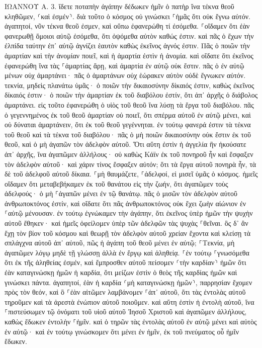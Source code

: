 \documentclass[twoside, 9pt]{extreport}
\begin{document}
ΙΩΑΝΝΟΥ Α.
3.
ἴδετε ποταπὴν ἀγάπην δέδωκεν ἡμῖν ὁ πατὴρ ἵνα τέκνα θεοῦ κληθῶμεν, ⸂καὶ ἐσμέν⸃. διὰ τοῦτο ὁ κόσμος οὐ γινώσκει ⸀ἡμᾶς ὅτι οὐκ ἔγνω αὐτόν. 
ἀγαπητοί, νῦν τέκνα θεοῦ ἐσμεν, καὶ οὔπω ἐφανερώθη τί ἐσόμεθα. ⸀οἴδαμεν ὅτι ἐὰν φανερωθῇ ὅμοιοι αὐτῷ ἐσόμεθα, ὅτι ὀψόμεθα αὐτὸν καθώς ἐστιν. 
καὶ πᾶς ὁ ἔχων τὴν ἐλπίδα ταύτην ἐπ᾽ αὐτῷ ἁγνίζει ἑαυτὸν καθὼς ἐκεῖνος ἁγνός ἐστιν. 
Πᾶς ὁ ποιῶν τὴν ἁμαρτίαν καὶ τὴν ἀνομίαν ποιεῖ, καὶ ἡ ἁμαρτία ἐστὶν ἡ ἀνομία. 
καὶ οἴδατε ὅτι ἐκεῖνος ἐφανερώθη ἵνα τὰς ⸀ἁμαρτίας ἄρῃ, καὶ ἁμαρτία ἐν αὐτῷ οὐκ ἔστιν. 
πᾶς ὁ ἐν αὐτῷ μένων οὐχ ἁμαρτάνει· πᾶς ὁ ἁμαρτάνων οὐχ ἑώρακεν αὐτὸν οὐδὲ ἔγνωκεν αὐτόν. 
τεκνία, μηδεὶς πλανάτω ὑμᾶς· ὁ ποιῶν τὴν δικαιοσύνην δίκαιός ἐστιν, καθὼς ἐκεῖνος δίκαιός ἐστιν· 
ὁ ποιῶν τὴν ἁμαρτίαν ἐκ τοῦ διαβόλου ἐστίν, ὅτι ἀπ᾽ ἀρχῆς ὁ διάβολος ἁμαρτάνει. εἰς τοῦτο ἐφανερώθη ὁ υἱὸς τοῦ θεοῦ ἵνα λύσῃ τὰ ἔργα τοῦ διαβόλου. 
πᾶς ὁ γεγεννημένος ἐκ τοῦ θεοῦ ἁμαρτίαν οὐ ποιεῖ, ὅτι σπέρμα αὐτοῦ ἐν αὐτῷ μένει, καὶ οὐ δύναται ἁμαρτάνειν, ὅτι ἐκ τοῦ θεοῦ γεγέννηται. 
ἐν τούτῳ φανερά ἐστιν τὰ τέκνα τοῦ θεοῦ καὶ τὰ τέκνα τοῦ διαβόλου· πᾶς ὁ μὴ ποιῶν δικαιοσύνην οὐκ ἔστιν ἐκ τοῦ θεοῦ, καὶ ὁ μὴ ἀγαπῶν τὸν ἀδελφὸν αὐτοῦ. 
Ὅτι αὕτη ἐστὶν ἡ ἀγγελία ἣν ἠκούσατε ἀπ᾽ ἀρχῆς, ἵνα ἀγαπῶμεν ἀλλήλους· 
οὐ καθὼς Κάϊν ἐκ τοῦ πονηροῦ ἦν καὶ ἔσφαξεν τὸν ἀδελφὸν αὐτοῦ· καὶ χάριν τίνος ἔσφαξεν αὐτόν; ὅτι τὰ ἔργα αὐτοῦ πονηρὰ ἦν, τὰ δὲ τοῦ ἀδελφοῦ αὐτοῦ δίκαια. 
⸀μὴ θαυμάζετε, ⸀ἀδελφοί, εἰ μισεῖ ὑμᾶς ὁ κόσμος. 
ἡμεῖς οἴδαμεν ὅτι μεταβεβήκαμεν ἐκ τοῦ θανάτου εἰς τὴν ζωήν, ὅτι ἀγαπῶμεν τοὺς ἀδελφούς· ὁ μὴ ⸀ἀγαπῶν μένει ἐν τῷ θανάτῳ. 
πᾶς ὁ μισῶν τὸν ἀδελφὸν αὐτοῦ ἀνθρωποκτόνος ἐστίν, καὶ οἴδατε ὅτι πᾶς ἀνθρωποκτόνος οὐκ ἔχει ζωὴν αἰώνιον ἐν ⸀αὐτῷ μένουσαν. 
ἐν τούτῳ ἐγνώκαμεν τὴν ἀγάπην, ὅτι ἐκεῖνος ὑπὲρ ἡμῶν τὴν ψυχὴν αὐτοῦ ἔθηκεν· καὶ ἡμεῖς ὀφείλομεν ὑπὲρ τῶν ἀδελφῶν τὰς ψυχὰς ⸀θεῖναι. 
ὃς δ᾽ ἂν ἔχῃ τὸν βίον τοῦ κόσμου καὶ θεωρῇ τὸν ἀδελφὸν αὐτοῦ χρείαν ἔχοντα καὶ κλείσῃ τὰ σπλάγχνα αὐτοῦ ἀπ᾽ αὐτοῦ, πῶς ἡ ἀγάπη τοῦ θεοῦ μένει ἐν αὐτῷ; 
⸀Τεκνία, μὴ ἀγαπῶμεν λόγῳ μηδὲ τῇ γλώσσῃ ἀλλὰ ἐν ἔργῳ καὶ ἀληθείᾳ. 
⸀ἐν τούτῳ ⸀γνωσόμεθα ὅτι ἐκ τῆς ἀληθείας ἐσμέν, καὶ ἔμπροσθεν αὐτοῦ πείσομεν ⸂τὴν καρδίαν⸃ ἡμῶν 
ὅτι ἐὰν καταγινώσκῃ ἡμῶν ἡ καρδία, ὅτι μείζων ἐστὶν ὁ θεὸς τῆς καρδίας ἡμῶν καὶ γινώσκει πάντα. 
ἀγαπητοί, ἐὰν ἡ καρδία ⸂μὴ καταγινώσκῃ ἡμῶν⸃, παρρησίαν ἔχομεν πρὸς τὸν θεόν, 
καὶ ὃ ⸀ἐὰν αἰτῶμεν λαμβάνομεν ⸀ἀπ᾽ αὐτοῦ, ὅτι τὰς ἐντολὰς αὐτοῦ τηροῦμεν καὶ τὰ ἀρεστὰ ἐνώπιον αὐτοῦ ποιοῦμεν. 
καὶ αὕτη ἐστὶν ἡ ἐντολὴ αὐτοῦ, ἵνα ⸀πιστεύσωμεν τῷ ὀνόματι τοῦ υἱοῦ αὐτοῦ Ἰησοῦ Χριστοῦ καὶ ἀγαπῶμεν ἀλλήλους, καθὼς ἔδωκεν ἐντολὴν ⸀ἡμῖν. 
καὶ ὁ τηρῶν τὰς ἐντολὰς αὐτοῦ ἐν αὐτῷ μένει καὶ αὐτὸς ἐν αὐτῷ· καὶ ἐν τούτῳ γινώσκομεν ὅτι μένει ἐν ἡμῖν, ἐκ τοῦ πνεύματος οὗ ἡμῖν ἔδωκεν. 
\end{document}
